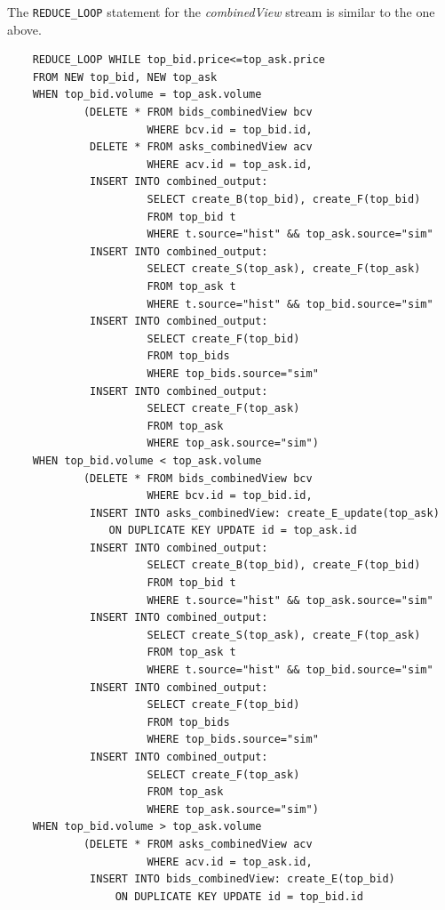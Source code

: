 \documentclass{article}
\begin{document}
The {\tt REDUCE\_LOOP} statement for the \emph{combinedView} stream is similar to the one above. 

\begin{verbatim}  
    REDUCE_LOOP WHILE top_bid.price<=top_ask.price
    FROM NEW top_bid, NEW top_ask
    WHEN top_bid.volume = top_ask.volume 
            (DELETE * FROM bids_combinedView bcv 
                      WHERE bcv.id = top_bid.id,
             DELETE * FROM asks_combinedView acv 
                      WHERE acv.id = top_ask.id,
             INSERT INTO combined_output:
                      SELECT create_B(top_bid), create_F(top_bid)
                      FROM top_bid t
                      WHERE t.source="hist" && top_ask.source="sim"
             INSERT INTO combined_output:
                      SELECT create_S(top_ask), create_F(top_ask)
                      FROM top_ask t
                      WHERE t.source="hist" && top_bid.source="sim"
             INSERT INTO combined_output: 
                      SELECT create_F(top_bid)
                      FROM top_bids
                      WHERE top_bids.source="sim"
             INSERT INTO combined_output: 
                      SELECT create_F(top_ask)
                      FROM top_ask
                      WHERE top_ask.source="sim")
    WHEN top_bid.volume < top_ask.volume 
            (DELETE * FROM bids_combinedView bcv 
                      WHERE bcv.id = top_bid.id,
             INSERT INTO asks_combinedView: create_E_update(top_ask)
                ON DUPLICATE KEY UPDATE id = top_ask.id
             INSERT INTO combined_output:
                      SELECT create_B(top_bid), create_F(top_bid)
                      FROM top_bid t
                      WHERE t.source="hist" && top_ask.source="sim"
             INSERT INTO combined_output:
                      SELECT create_S(top_ask), create_F(top_ask)
                      FROM top_ask t
                      WHERE t.source="hist" && top_bid.source="sim"
             INSERT INTO combined_output: 
                      SELECT create_F(top_bid)
                      FROM top_bids
                      WHERE top_bids.source="sim"
             INSERT INTO combined_output: 
                      SELECT create_F(top_ask)
                      FROM top_ask
                      WHERE top_ask.source="sim")
    WHEN top_bid.volume > top_ask.volume 
            (DELETE * FROM asks_combinedView acv 
                      WHERE acv.id = top_ask.id,
             INSERT INTO bids_combinedView: create_E(top_bid) 
                 ON DUPLICATE KEY UPDATE id = top_bid.id

\end{verbatim}
\end{document}
